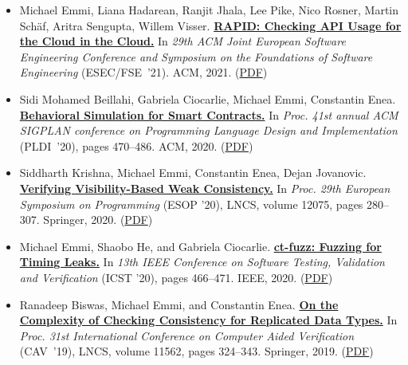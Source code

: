 \documentclass{article}
\begin{document}
  \begin{itemize}[leftmargin=0cm,label={}]

    \item Michael Emmi, Liana Hadarean, Ranjit Jhala, Lee Pike, Nico Rosner, Martin Schäf, Aritra Sengupta, Willem Visser. {\bf\href{%
    https://doi.org/10.1145/3468264.3473934}{%
    RAPID: Checking API Usage for the Cloud in the Cloud.}} In \emph{ 29th ACM Joint European Software Engineering Conference and Symposium on the Foundations of Software Engineering } (ESEC/FSE ’21). ACM, 2021. (\href{https://michael-emmi.github.io/https://github.com/michael-emmi/research-papers/raw/master/conf-sigsoft-EmmiHJPRSSV21.pdf}{PDF})


    \item Sidi Mohamed Beillahi, Gabriela Ciocarlie, Michael Emmi, Constantin Enea. {\bf\href{%
    https://doi.org/10.1145/3385412.3386022}{%
    Behavioral Simulation for Smart Contracts.}} In \emph{ Proc. 41st annual ACM SIGPLAN conference on Programming Language Design and Implementation } (PLDI ’20), pages 470–486. ACM, 2020. (\href{https://michael-emmi.github.io/https://github.com/michael-emmi/research-papers/raw/master/conf-pldi-BeillahiCEE20.pdf}{PDF})


    \item Siddharth Krishna, Michael Emmi, Constantin Enea, Dejan Jovanovic. {\bf\href{%
    https://doi.org/10.1007/978-3-030-44914-8_11}{%
    Verifying Visibility-Based Weak Consistency.}} In \emph{ Proc. 29th European Symposium on Programming } (ESOP ’20), LNCS, volume 12075, pages 280–307. Springer, 2020. (\href{https://michael-emmi.github.io/https://github.com/michael-emmi/research-papers/raw/master/conf-esop-KrishnaEEJ20.pdf}{PDF})


    \item Michael Emmi, Shaobo He, and Gabriela Ciocarlie. {\bf\href{%
    https://doi.org/10.1109/ICST46399.2020.00063}{%
    ct-fuzz: Fuzzing for Timing Leaks.}} In \emph{ 13th IEEE Conference on Software Testing, Validation and Verification } (ICST ’20), pages 466–471. IEEE, 2020. (\href{https://michael-emmi.github.io/https://github.com/michael-emmi/research-papers/raw/master/conf-icst-HeEC20.pdf}{PDF})


    \item Ranadeep Biswas, Michael Emmi, and Constantin Enea. {\bf\href{%
    https://doi.org/10.1007/978-3-030-25543-5_19}{%
    On the Complexity of Checking Consistency for Replicated Data Types.}} In \emph{ Proc. 31st International Conference on Computer Aided Verification } (CAV ’19), LNCS, volume 11562, pages 324–343. Springer, 2019. (\href{https://michael-emmi.github.io/https://github.com/michael-emmi/research-papers/raw/master/conf-cav-BiswasEE19.pdf}{PDF})



\end{itemize}
\end{document}
